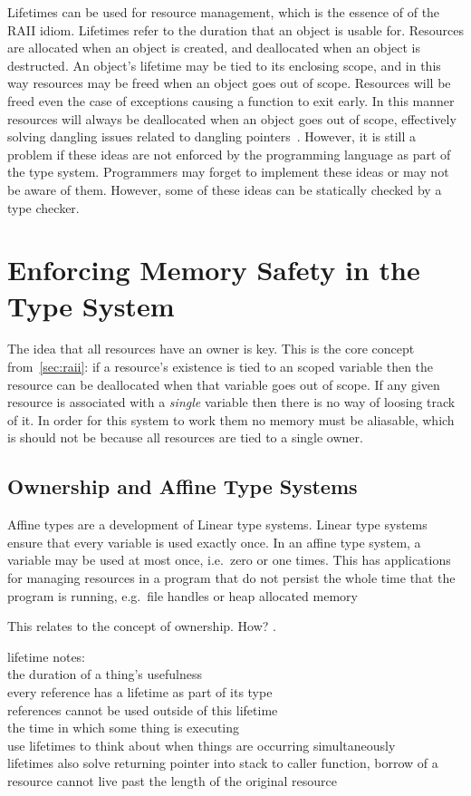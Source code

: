 Lifetimes can be used for resource management, which is the essence of of the
RAII idiom. Lifetimes refer to the duration that an object is usable for.
Resources are allocated when an object is created, and deallocated when an
object is destructed. An object's lifetime may be tied to its enclosing scope,
and in this way resources may be freed when an object goes out of scope.
Resources will be freed even the case of exceptions causing a function to exit
early. In this manner resources will always be deallocated when an object goes
out of scope, effectively solving dangling issues related to dangling
pointers~\cite{rust}. However, it is still a problem if these ideas are not
enforced by the programming language as part of the type system. Programmers
may forget to implement these ideas or may not be aware of them. However, some
of these ideas can be statically checked by a type checker.

\section{Enforcing Memory Safety in the Type System}
The idea that all resources have an owner is key. This is the core concept
from~\ref{sec:raii}: if a resource's existence is tied to an scoped variable
then the resource can be deallocated when that variable goes out of scope.  If
any given resource is associated with a \textit{single} variable then there is
no way of loosing track of it. In order for this system to work them no memory
must be aliasable, which is should not be because all resources are tied to a
single owner.

\subsection{Ownership and Affine Type Systems}
Affine types are a development of Linear type systems. Linear type systems
ensure that every variable is used exactly once. \cite{ownership} In an affine type system, a
variable may be used at most once, i.e.\ zero or one times. This has
applications for managing resources in a program that do not persist the whole
time that the program is running, e.g.\ file handles or heap allocated memory

This relates to the concept of ownership. How?
\cite{attapl} \cite{tovAffine}.

lifetime notes: \\
the duration of a thing's usefulness \\
every reference has a lifetime as part of its type \\
references cannot be used outside of this lifetime \\
the time in which some thing is executing \\
use lifetimes to think about when things are occurring simultaneously \\
lifetimes also solve returning pointer into stack to caller function,
borrow of a resource cannot live past the length of the original resource

